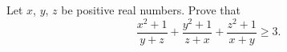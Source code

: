 Let $x$, $y$, $z$ be positive real numbers. Prove that
\[
\dfrac{x^2+1}{y+z}+\dfrac{y^2+1}{z+x}+\dfrac{z^2+1}{x+y}\ge3 .
\]

